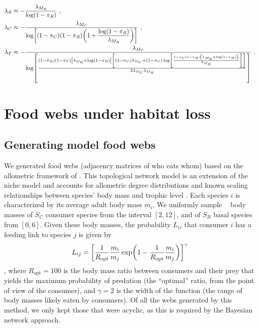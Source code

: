 \documentclass[11pt]{article}
\let\originalleft\left
\let\originalright\right
\renewcommand{\left}{\mathopen{}\mathclose\bgroup\originalleft}
\renewcommand{\right}{\aftergroup\egroup\originalright}
\newcommand*{\logten}{\mathop{\log_{10}}}
\begin{document}
\begin{align}
  \label{eq:BN_lambda_omniv_R_nonspatial_2}
  \lambda_R &\approx -\frac{\lambda_{M_R}}{\log(1 - \pi_R)} \ , \\
  \label{eq:BN_lambda_omniv_C_nonspatial_2}
  \lambda_C &\approx -\frac{\lambda_{M_C}}{\log\left[ (1 - \pi_C) (1 - \pi_R)
              \left( 1+\dfrac{\log(1-\pi_R)}{\lambda_{M_R}}\right)\right]} \ , \\
  \label{eq:BN_lambda_omniv_T_nonspatial_2}
  \lambda_T &\approx -\frac{\lambda_{M_T}}{\log \left[ \frac{(1-\pi_R) (1-\pi_T)
              \left[ \lambda_{M_R} + \log(1-\pi_R) \right] \left[
              (2-\pi _C) \lambda_{M_C} + (1-\pi_C) \log \left[ \frac{1-\pi_C
              (1-\pi_R) \left( \lambda_{M_R} + \log \left(1 - \pi_R \right)
              \right)}{\lambda_{M_R}} \right] \right]}{2 \lambda_{M_C}
              \lambda_{M_R}} \right]} \ .
\end{align}


\section{Food webs under habitat loss}

\subsection{Generating model food webs} \label{sec:allo}

We generated food webs (adjacency matrices of who eats whom) based on the allometric framework of \citet{Schneider2016}. This topological network model is an extension of the niche model \citep{Williams2000} and accounts for allometric degree distributions and known scaling relationships between species' body mass and trophic level \citep{Riede2011Size-basedExtinctions}. Each species $i$ is characterized by its average adult body mass $m_i$. We uniformly sample $\logten$ body masses of $S_C$ consumer species from the interval $[2, 12]$, and of $S_B$ basal species from $[0, 6]$. Given these body masses, the probability $L_{ij}$ that consumer $i$ has a feeding link to species $j$ is given by
\begin{equation}
  \label{eq:feeding_prob}
  L_{ij} = \left[ \frac{1}{R_{\text{opt}}} \frac{m_i}{m_j} \exp
    \left( 1 - \frac{1}{R_{\text{opt}}} \frac{m_i}{m_j} \right) \right]^{\gamma}
\end{equation}
\citep{Schneider2016}, where $R_{\text{opt}} = 100$ is the body mass ratio between consumers and their prey that yields the maximum probability of predation (the ``optimal'' ratio, from the point of view of the consumer), and $\gamma = 2$ is the width of the function (the range of body masses likely eaten by consumers). Of all the webs generated by this method, we only kept those that were acyclic, as this is required by the Bayesian network approach.
\end{document}
